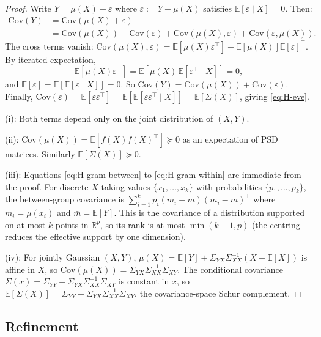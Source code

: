 \documentclass[11pt,a4paper]{article}
\numberwithin{equation}{section}
\newcommand{\R}{\mathbb{R}}
\theoremstyle{thmcompact}
\theoremstyle{remark}
\begin{document}
\begin{proof}
Write $Y = \mu(X) + \varepsilon$ where $\varepsilon := Y - \mu(X)$ satisfies $\mathbb{E}[\varepsilon \mid X] = 0$. Then:
\begin{align*}
\mathrm{Cov}(Y) &= \mathrm{Cov}(\mu(X) + \varepsilon) \\
&= \mathrm{Cov}(\mu(X)) + \mathrm{Cov}(\varepsilon) + \mathrm{Cov}(\mu(X), \varepsilon) + \mathrm{Cov}(\varepsilon, \mu(X)).
\end{align*}
The cross terms vanish: $\mathrm{Cov}(\mu(X), \varepsilon) = \mathbb{E}[\mu(X)\varepsilon^\top] - \mathbb{E}[\mu(X)]\mathbb{E}[\varepsilon]^\top$. By iterated expectation,
\[
\mathbb{E}[\mu(X)\varepsilon^\top] = \mathbb{E}[\mu(X)\,\mathbb{E}[\varepsilon^\top \mid X]] = 0,
\]
and $\mathbb{E}[\varepsilon] = \mathbb{E}[\mathbb{E}[\varepsilon \mid X]] = 0$. So $\mathrm{Cov}(Y) = \mathrm{Cov}(\mu(X)) + \mathrm{Cov}(\varepsilon)$. Finally, $\mathrm{Cov}(\varepsilon) = \mathbb{E}[\varepsilon\varepsilon^\top] = \mathbb{E}[\mathbb{E}[\varepsilon\varepsilon^\top \mid X]] = \mathbb{E}[\Sigma(X)]$, giving \eqref{eq:H-eve}.

(i): Both terms depend only on the joint distribution of $(X, Y)$.

(ii): $\mathrm{Cov}(\mu(X)) = \mathbb{E}[f(X)f(X)^\top] \succeq 0$ as an expectation of PSD matrices. Similarly $\mathbb{E}[\Sigma(X)] \succeq 0$.

(iii): Equations \eqref{eq:H-gram-between} to \eqref{eq:H-gram-within} are immediate from the proof. For discrete $X$ taking values $\{x_1, \ldots, x_k\}$ with probabilities $\{p_1, \ldots, p_k\}$, the between-group covariance is $\sum_{i=1}^k p_i (m_i - \bar{m})(m_i - \bar{m})^\top$ where $m_i = \mu(x_i)$ and $\bar{m} = \mathbb{E}[Y]$. This is the covariance of a distribution supported on at most $k$ points in $\R^p$, so its rank is at most $\min(k{-}1, p)$ (the centring reduces the effective support by one dimension).

(iv): For jointly Gaussian $(X, Y)$, $\mu(X) = \mathbb{E}[Y] + \Sigma_{YX}\Sigma_{XX}^{-1}(X - \mathbb{E}[X])$ is affine in $X$, so $\mathrm{Cov}(\mu(X)) = \Sigma_{YX}\Sigma_{XX}^{-1}\Sigma_{XY}$. The conditional covariance $\Sigma(x) = \Sigma_{YY} - \Sigma_{YX}\Sigma_{XX}^{-1}\Sigma_{XY}$ is constant in $x$, so $\mathbb{E}[\Sigma(X)] = \Sigma_{YY} - \Sigma_{YX}\Sigma_{XX}^{-1}\Sigma_{XY}$, the covariance-space Schur complement.
\end{proof}

\subsection{Refinement}
\end{document}
